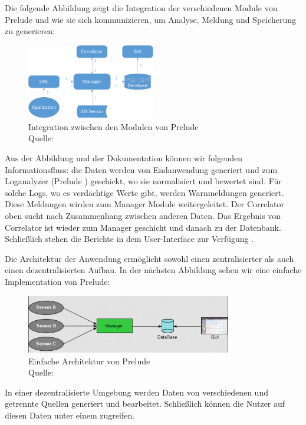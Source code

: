 Die folgende Abbildung zeigt die Integration der verschiedenen Module von Prelude und wie sie sich kommunizieren, um Analyse, Meldung und Speicherung zu generieren:

\begin{figure}[H]
   \centering
   \includegraphics[width=0.5\textwidth]{assets/2_p3.png}
   \caption{Integration zwischen den Modulen von Prelude \\Quelle: \citep{Prelude_MU} }
   \centering
\end{figure}

Aus der Abbildung und der Dokumentation können wir folgenden Informationsfluss: die Daten werden von Endanwendung generiert und zum Loganalyzer (Prelude ) geschickt, wo sie normalisiert und bewertet sind. Für solche Logs, wo es verdächtige Werte gibt, werden Warnmeldungen generiert. Diese Meldungen wirden zum Manager Module weitergeleitet. Der Correlator oben sucht nach Zusammenhang zwischen anderen Daten. Das Ergebnis von Correlator ist wieder zum Manager geschicht und danach zu der Datenbank. Schließlich stehen die Berichte in dem User-Interface zur Verfügung \citep{Prelude_Doc}.

Die Architektur der Anwendung ermöglicht sowohl einen zentralisierter als auch einen dezentralisierten Aufbau. In der nächsten Abbildung sehen wir eine einfache Implementation von Prelude: 

\begin{figure}[H]
   \centering
   \includegraphics[width=0.8\textwidth]{assets/2_p4.png}
   \caption{Einfache Architektur von Prelude \\Quelle: \citep{Prelude_MU} }
   \centering
\end{figure}

In einer dezentralisierte Umgebung werden Daten von verschiedenen und getrennte Quellen generiert und bearbeitet. Schließlich können die Nutzer auf diesen Daten unter einem  zugreifen.

